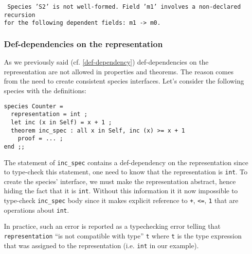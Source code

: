 \noindent
{\scriptsize
{\tt
Species 'S2' is not well-formed. Field
'm1' involves a non-declared recursion\\
for the following dependent fields: m1 -> m0.
}
}

\subsubsection{Def-dependencies on the representation}
\label{def-dep-on-representation}
As we previously said (cf. \ref{def-dependency}) def-dependencies on
the representation are not allowed in properties and theorems. The reason
comes from the need to create consistent species interfaces. Let's
consider the following species with the definitions:
{\scriptsize
\begin{lstlisting}
species Counter =
  representation = int ;
  let inc (x in Self) = x + 1 ;
  theorem inc_spec : all x in Self, inc (x) >= x + 1
    proof = ... ;
end ;;
\end{lstlisting}
}

The statement of {\tt inc\_spec} contains a def-dependency on the
representation since to type-check this statement, one need to know
that the representation is  {\tt int}. To create the species'
interface, we must make the representation abstract, hence hiding the
fact that it is {\tt int}. Without this information it it now
impossible to type-check  {\tt inc\_spec}  body since it
makes explicit reference to {\tt +}, {\tt <=}, {\tt 1} that are
operations about {\tt int}.

In practice, such an error is reported as a typechecking error telling
that {\tt representation} ``is not compatible with type'' {\tt t}
where {\tt t} is the type expression that was assigned to the
representation (i.e. {\tt int} in our example).
